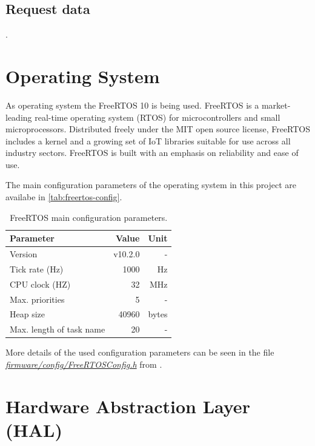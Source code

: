 \subsection{Request data}

.

\section{Operating System}

As operating system the FreeRTOS 10 \cite{freertos} is being used. FreeRTOS is a market-leading real-time operating system (RTOS) for microcontrollers and small microprocessors. Distributed freely under the MIT open source license, FreeRTOS includes a kernel and a growing set of IoT libraries suitable for use across all industry sectors. FreeRTOS is built with an emphasis on reliability and ease of use.

The main configuration parameters of the operating system in this project are availabe in \autoref{tab:freertos-config}.

\begin{table}[!h]
    \centering
    \begin{tabular}{lrr}
        \toprule[1.5pt]
        \textbf{Parameter}       & \textbf{Value} & \textbf{Unit} \\
        \midrule
        Version                  & v10.2.0        & - \\
        Tick rate (Hz)           & 1000           & Hz \\
        CPU clock (HZ)           & 32             & MHz \\
        Max. priorities          & 5              & - \\
        Heap size                & 40960          & bytes \\
        Max. length of task name & 20             & - \\
        \bottomrule[1.5pt]
    \end{tabular}
    \caption{FreeRTOS main configuration parameters.}
    \label{tab:freertos-config}
\end{table}

More details of the used configuration parameters can be seen in the file \textit{\href{https://github.com/spacelab-ufsc/obdh2/blob/master/firmware/config/FreeRTOSConfig.h}{firmware/config/FreeRTOSConfig.h}} from \cite{obdh2-repo}.

\section{Hardware Abstraction Layer (HAL)}

